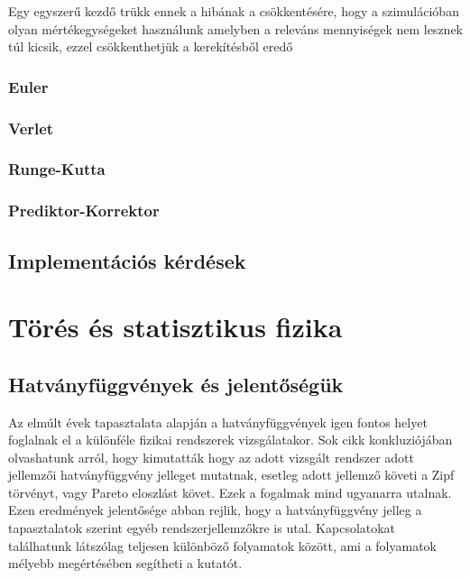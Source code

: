 Egy egyszerű kezdő trükk ennek a hibának a csökkentésére, hogy a szimulációban olyan mértékegységeket használunk amelyben a releváns mennyiségek nem lesznek túl kicsik, ezzel csökkenthetjük a kerekítésből eredő


\subsubsection*{Euler}

\subsubsection*{Verlet}

\subsubsection*{Runge-Kutta}

\subsubsection*{Prediktor-Korrektor}

\subsection*{Implementációs kérdések}

\section{Törés és statisztikus fizika}



	\subsection{Hatványfüggvények és jelentőségük}
	Az elmúlt évek tapasztalata alapján a hatványfüggvények igen fontos helyet foglalnak el a különféle
	fizikai rendszerek vizsgálatakor. Sok cikk konkluziójában olvashatunk arról, hogy kimutatták hogy az adott vizsgált rendszer adott jellemzői hatványfüggvény jelleget mutatnak, esetleg adott jellemző követi a Zipf törvényt, vagy Pareto eloszlást követ. Ezek a fogalmak mind ugyanarra utalnak. Ezen eredmények jelentősége abban rejlik, hogy a hatványfüggvény jelleg a tapasztalatok szerint egyéb rendszerjellemzőkre is utal. Kapcsolatokat találhatunk látszólag teljesen különböző folyamatok között, ami a folyamatok mélyebb megértésében segítheti a kutatót. 
	
